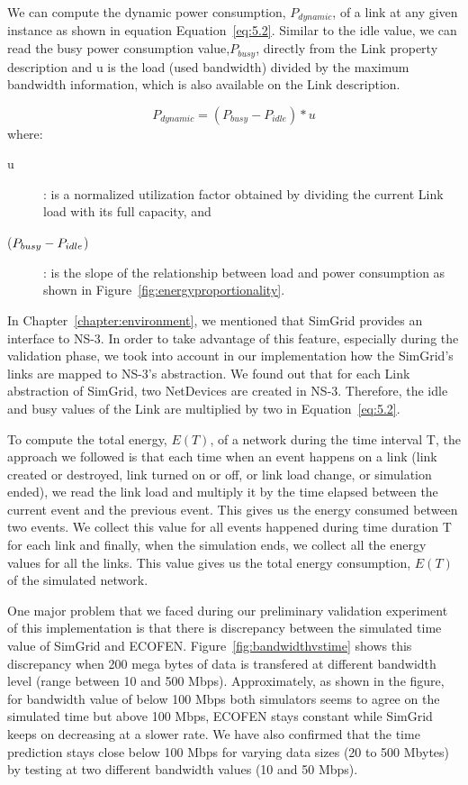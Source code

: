 We can compute the dynamic power consumption, \(P_{dynamic}\), of a link at any given instance as shown in equation Equation~\ref{eq:5.2}. Similar to the idle value, we can read the busy power consumption value,\(P_{busy}\), directly from the 
Link property description and u is the load (used bandwidth) divided by the maximum bandwidth information, which is also available on the Link description. 

\begin{equation} \label{eq:5.2}
P_{dynamic} = (P_{busy} - P_{idle}) * u 
\end{equation} 
where:
\begin{description}
    \item [u]: is a normalized utilization factor obtained by dividing the current Link load with its full capacity, and 
    \item [(\($$P_{busy} - P_{idle}$$\))]: is the slope of the relationship between load and power consumption as shown in Figure~\ref{fig:energyproportionality}.
\end{description} 
In Chapter~\ref{chapter:environment}, we mentioned that SimGrid provides an interface to NS-3. In order to take advantage of this feature, especially during the validation phase, we took into account in our implementation how the SimGrid's links are mapped to NS-3's abstraction. We found out that for each Link abstraction of SimGrid, two NetDevices are created in NS-3. Therefore, the idle and busy values of the Link are multiplied by two in Equation~\ref{eq:5.2}.

To compute the total energy, \(E(T)\), of a network during the time interval T, the approach we followed is that each time when an event happens on a link (link created or destroyed, link turned on or off, or link load change, or simulation ended), we read the link load and multiply it by the time elapsed between the current event and the previous event. This gives us the energy consumed between two events. We collect this value for all events happened during time duration T for each link and finally, when the simulation ends, we collect all the energy values for all the links. This value gives us the total energy consumption, \(E(T)\) of the simulated network.

One major problem that we faced during our preliminary validation experiment of this implementation is that there is discrepancy between the simulated time value of SimGrid and ECOFEN. Figure~\ref{fig:bandwidthvstime} shows this discrepancy when 200 mega bytes of data is transfered at different bandwidth level (range between 10 and 500 Mbps). Approximately, as shown in the figure, for bandwidth value of below 100 Mbps both simulators seems to agree on the simulated time but above 100 Mbps, ECOFEN stays constant while SimGrid keeps on decreasing at a slower rate. We have also confirmed that the time prediction stays close below 100 Mbps for varying data sizes (20 to 500 Mbytes) by testing at two different bandwidth values (10 and 50 Mbps).

